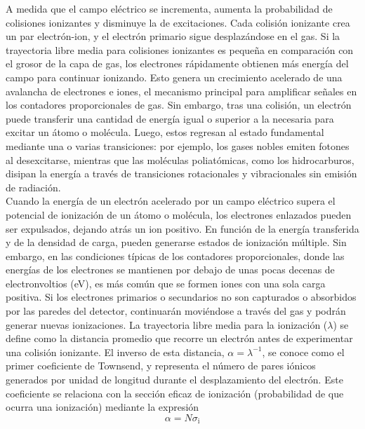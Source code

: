 \documentclass{article}
\begin{document}
\noindent A medida que el campo eléctrico se incrementa, aumenta la probabilidad de colisiones ionizantes y disminuye la de excitaciones. Cada colisión ionizante crea un par electrón-ion, y el electrón primario sigue desplazándose en el gas. Si la trayectoria libre media para colisiones ionizantes es pequeña en comparación con el grosor de la capa de gas, los electrones rápidamente obtienen más energía del campo para continuar ionizando. Esto genera un crecimiento acelerado de una avalancha de electrones e iones, el mecanismo principal para amplificar señales en los contadores proporcionales de gas. Sin embargo, tras una colisión, un electrón puede transferir una cantidad de energía igual o superior a la necesaria para excitar un átomo o molécula. Luego, estos regresan al estado fundamental mediante una o varias transiciones: por ejemplo, los gases nobles emiten fotones al desexcitarse, mientras que las moléculas poliatómicas, como los hidrocarburos, disipan la energía a través de transiciones rotacionales y vibracionales sin emisión de radiación.\\

\noindent Cuando la energía de un electrón acelerado por un campo eléctrico supera el potencial de ionización de un átomo o molécula, los electrones enlazados pueden ser expulsados, dejando atrás un ion positivo. En función de la energía transferida y de la densidad de carga, pueden generarse estados de ionización múltiple. Sin embargo, en las condiciones típicas de los contadores proporcionales, donde las energías de los electrones se mantienen por debajo de unas pocas decenas de electronvoltios (eV), es más común que se formen iones con una sola carga positiva. Si los electrones primarios o secundarios no son capturados o absorbidos por las paredes del detector, continuarán moviéndose a través del gas y podrán generar nuevas ionizaciones. La trayectoria libre media para la ionización ($\lambda$) se define como la distancia promedio que recorre un electrón antes de experimentar una colisión ionizante. El inverso de esta distancia, $\alpha = \lambda ^{-1}$, se conoce como el primer coeficiente de Townsend, y representa el número de pares iónicos generados por unidad de longitud durante el desplazamiento del electrón. Este coeficiente se relaciona con la sección eficaz de ionización (probabilidad de que ocurra una ionización) mediante la expresión 
\begin{equation}
    \alpha=N \sigma_{\mathrm{i}}
\end{equation}
\end{document}
